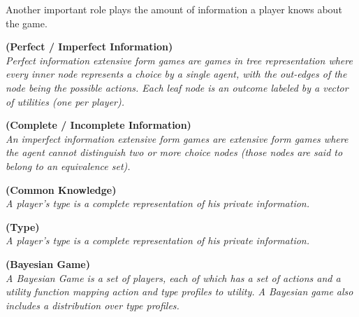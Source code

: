 \newline
Another important role plays the amount of information a player knows about the game. 
\begin{defi}{\textbf{(Perfect / Imperfect Information)}}\\
\emph{Perfect information extensive form games are games in tree representation where every inner node represents
a choice by a single agent, with the out-edges of the node being the possible actions.
Each leaf node is an outcome labeled by a vector of utilities (one per player).}
\end{defi}
\begin{defi}{\textbf{(Complete / Incomplete Information)}}\\
\emph{An imperfect information extensive form games are extensive form games where the agent cannot distinguish
two or more choice nodes (those nodes are said to belong to an equivalence set).}
\end{defi}
\begin{defi}{\textbf{(Common Knowledge)}}\\
\emph{A player's \emph{type} is a complete representation of his private information.}
\end{defi}

\begin{defi}{\textbf{(Type)}}\\
\emph{A player's \emph{type} is a complete representation of his private information.}
\end{defi}
\begin{defi}{\textbf{(Bayesian Game)}}\\
\emph{A Bayesian Game is a set of players, each of which has a set of actions and a utility function mapping action and type profiles to utility. A Bayesian game also includes a distribution over type profiles.}
\end{defi}
